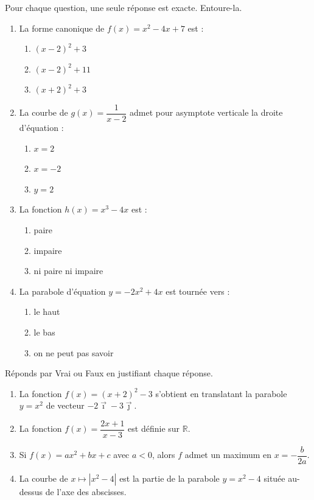 \documentclass[11pt]{article}
\begin{document}
\begin{exercice}[QCM]
Pour chaque question, une seule réponse est exacte. Entoure-la.
\begin{enumerate}
\item La forme canonique de $f(x)=x^2-4x+7$ est :
\begin{enumerate}
\item $(x-2)^2+3$ \quad \item $(x-2)^2+11$ \quad \item $(x+2)^2+3$
\end{enumerate}
\item La courbe de $g(x)=\dfrac{1}{x-2}$ admet pour asymptote verticale la droite d'équation :
\begin{enumerate}
\item $x=2$ \quad \item $x=-2$ \quad \item $y=2$
\end{enumerate}
\item La fonction $h(x)=x^3-4x$ est :
\begin{enumerate}
\item paire \quad \item impaire \quad \item ni paire ni impaire
\end{enumerate}
\item La parabole d'équation $y=-2x^2+4x$ est tournée vers :
\begin{enumerate}
\item le haut \quad \item le bas \quad \item on ne peut pas savoir
\end{enumerate}
\end{enumerate}
\end{exercice}

\begin{exercice}
Réponds par Vrai ou Faux en justifiant chaque réponse.
\begin{enumerate}
\item La fonction $f(x)=(x+2)^2-3$ s'obtient en translatant la parabole $y=x^2$ de vecteur $-2\vec{\imath}-3\vec{\jmath}$.
\item La fonction $f(x)=\dfrac{2x+1}{x-3}$ est définie sur $\mathbb{R}$.
\item Si $f(x)=ax^2+bx+c$ avec $a<0$, alors $f$ admet un maximum en $x=-\dfrac{b}{2a}$.
\item La courbe de $x\mapsto |x^2-4|$ est la partie de la parabole $y=x^2-4$ située au-dessus de l'axe des abscisses.
\end{enumerate}
\end{exercice}
\end{document}
